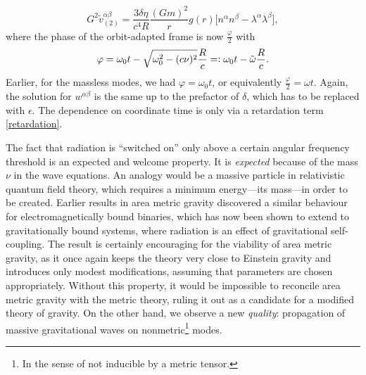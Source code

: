 \begin{enumerate}
    \begin{equation}
      G^2\tilde v^{\alpha\beta}_{(2)} = \frac{3\delta\eta}{c^4R}\frac{(Gm)^2}{r}g(r)\lbrack n^\alpha n^\beta - \lambda^\alpha\lambda^\beta\rbrack,
    \end{equation}
    where the phase of the orbit-adapted frame is now $\frac{\varphi}{2}$ with
    \begin{equation}\label{retardation}
      \varphi = \omega_0t-\sqrt{\omega_0^2 - (c\nu)^2} \frac{R}{c} =\vcentcolon \omega_0t - \tilde\omega\frac{R}{c}.
    \end{equation}
    Earlier, for the massless modes, we had $\varphi = \omega_0t$, or equivalently $\frac{\varphi}{2} = \omega t$. Again, the solution for $w^{\alpha\beta}$ is the same up to the prefactor of $\delta$, which has to be replaced with $\epsilon$. The dependence on coordinate time is only via a retardation term \eqref{retardation}.
\end{enumerate}

The fact that radiation is ``switched on'' only above a certain angular frequency threshold is an expected and welcome property. It is \emph{expected} because of the mass $\nu$ in the wave equations. An analogy would be a massive particle in relativistic quantum field theory, which requires a minimum energy---its mass---in order to be created. Earlier results \cite{} in area metric gravity discovered a similar behaviour for electromagnetically bound binaries, which has now been shown to extend to gravitationally bound systems, where radiation is an effect of gravitational self-coupling. The result is certainly encouraging for the viability of area metric gravity, as it once again keeps the theory very close to Einstein gravity and introduces only modest modifications, assuming that parameters are chosen appropriately. Without this property, it would be impossible to reconcile area metric gravity with the metric theory, ruling it out as a candidate for a modified theory of gravity. On the other hand, we observe a new \emph{quality}: propagation of massive gravitational waves on nonmetric\footnote{In the sense of not inducible by a metric tensor.} modes.

